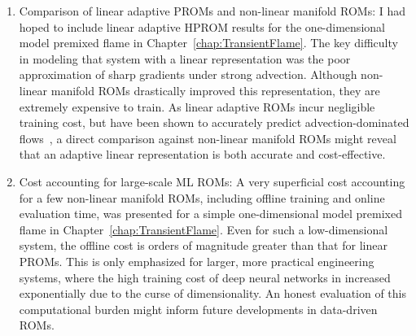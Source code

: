 \begin{enumerate}
    \item Comparison of linear adaptive PROMs and non-linear manifold ROMs: I had hoped to include linear adaptive HPROM results for the one-dimensional model premixed flame in Chapter~\ref{chap:TransientFlame}. The key difficulty in modeling that system with a linear representation was the poor approximation of sharp gradients under strong advection. Although non-linear manifold ROMs drastically improved this representation, they are extremely expensive to train. As linear adaptive ROMs incur negligible training cost, but have been shown to accurately predict advection-dominated flows~\cite{WayneIsaacTanUy2022}, a direct comparison against non-linear manifold ROMs might reveal that an adaptive linear representation is both accurate and cost-effective. 
    \item Cost accounting for large-scale ML ROMs: A very superficial cost accounting for a few non-linear manifold ROMs, including offline training and online evaluation time, was presented for a simple one-dimensional model premixed flame in Chapter~\ref{chap:TransientFlame}. Even for such a low-dimensional system, the offline cost is orders of magnitude greater than that for linear PROMs. This is only emphasized for larger, more practical engineering systems, where the high training cost of deep neural networks in increased exponentially due to the curse of dimensionality. An honest evaluation of this computational burden might inform future developments in data-driven ROMs.   
\end{enumerate}